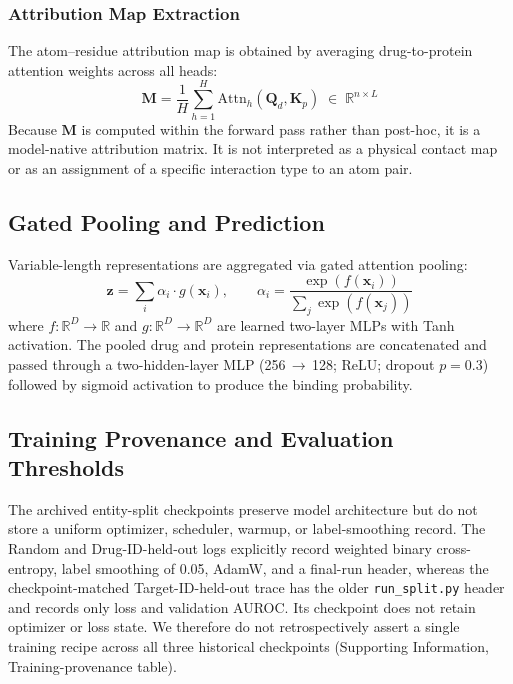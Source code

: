 \documentclass[fleqn,10pt]{wlscirep}
\begin{document}
\begingroup\color{red}\subsubsection{Attribution Map Extraction}\endgroup

The atom--residue attribution map is obtained by averaging drug-to-protein
attention weights across all heads:
\begin{equation}
\mathbf{M} = \frac{1}{H}\sum_{h=1}^{H}
  \mathrm{Attn}_h(\mathbf{Q}_d,\mathbf{K}_p)
  \;\in\;\mathbb{R}^{n\times L}
\label{eq:interaction_map}
\end{equation}
Because $\mathbf{M}$ is computed within the forward pass rather than post-hoc,
it is a model-native attribution matrix.  It is not interpreted as a physical
contact map or as an assignment of a specific interaction type to an atom pair.

\subsection{Gated Pooling and Prediction}

Variable-length representations are aggregated via gated attention pooling:
\begin{equation}
\mathbf{z} = \sum_{i}\alpha_i\cdot g(\mathbf{x}_i),\qquad
\alpha_i = \frac{\exp(f(\mathbf{x}_i))}{\sum_j\exp(f(\mathbf{x}_j))}
\end{equation}
where $f\colon\mathbb{R}^D\to\mathbb{R}$ and
$g\colon\mathbb{R}^D\to\mathbb{R}^D$ are learned two-layer MLPs with Tanh
activation.  The pooled drug and protein representations are concatenated and
passed through a two-hidden-layer MLP (256\,$\to$\,128; ReLU; dropout $p=0.3$)
followed by sigmoid activation to produce the binding probability.

\begingroup\color{red}
\subsection{Training Provenance and Evaluation Thresholds}

The archived entity-split checkpoints preserve model architecture but do not
store a uniform optimizer, scheduler, warmup, or label-smoothing record. The
Random and Drug-ID-held-out logs explicitly record weighted binary
cross-entropy, label smoothing of 0.05, AdamW, and a final-run header, whereas
the checkpoint-matched Target-ID-held-out trace has the older
\texttt{run\_split.py} header and records only loss and validation AUROC. Its
checkpoint does not retain optimizer or loss state. We therefore do not
retrospectively assert a single training recipe across all three historical
checkpoints (Supporting Information, Training-provenance table).
\end{document}
